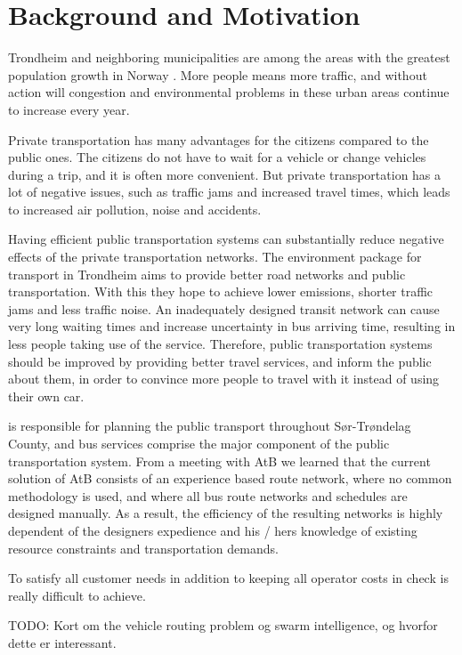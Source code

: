 \section{Background and Motivation}

Trondheim and neighboring municipalities are among the areas with the greatest population growth in Norway \citep{website:miljopakken}. More people means more traffic, and without action will congestion and environmental problems in these urban areas continue to increase every year. 

Private transportation has many advantages for the citizens compared to the public ones. The citizens do not have to wait for a vehicle or change vehicles during a trip, and it is often more convenient. But private transportation has a lot of negative issues, such as traffic jams and increased travel times, which leads to increased air pollution, noise and accidents. 

Having efficient public transportation systems can substantially reduce negative effects of the private transportation networks. The environment package \citep{website:miljopakken} for transport in Trondheim aims to provide better road networks and public transportation. With this they hope to achieve lower emissions, shorter traffic jams and less traffic noise. An inadequately designed transit network can cause very long waiting times and increase uncertainty in bus arriving time, resulting in less people taking use of the service. Therefore, public transportation systems should be improved by providing better travel services, and inform the public about them, in order to convince more people to travel with it instead of using their own car. 

 \citet{website:atb} is responsible for planning the public transport throughout Sør-Trøndelag County, and bus services comprise the major component of the public transportation system. From a meeting with AtB we learned that the current solution of AtB consists of an experience based route network, where no common methodology is used, and where all bus route networks and schedules are designed manually. As a result, the efficiency of the resulting networks is highly dependent of the designers expedience and his / hers knowledge of existing resource constraints and transportation demands.

To satisfy all customer needs in addition to keeping all operator costs in check is really difficult to achieve. 

TODO: Kort om the vehicle routing problem og swarm intelligence, og hvorfor dette er interessant. 

